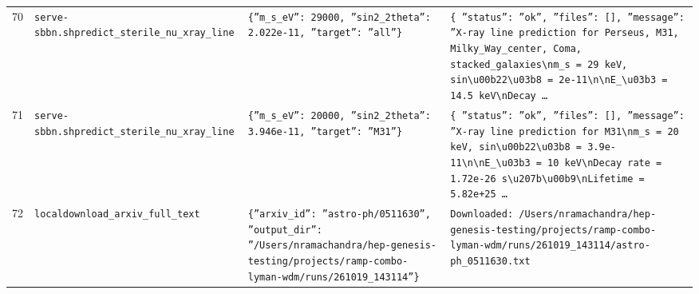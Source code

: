 \documentclass[11pt,a4paper]{article}
\begin{document}
\begin{longtable}{@{}p{}p{}p{}p{}@{}}
70 & \texttt{serve-sbbn.sh}\newline\texttt{predict\_\allowbreak{}sterile\_\allowbreak{}nu\_\allowbreak{}xray\_\allowbreak{}line} & \texttt{\{''m\_\allowbreak{}s\_\allowbreak{}eV'':\allowbreak{} 29000,\allowbreak{} ''sin2\_\allowbreak{}2theta'':\allowbreak{} 2.022e-11,\allowbreak{} ''target'':\allowbreak{} ''all''\}\allowbreak{}} & \texttt{\{   ''status'':\allowbreak{} ''ok'',\allowbreak{}   ''files'':\allowbreak{} []\allowbreak{},\allowbreak{}   ''message'':\allowbreak{} ''X-ray line prediction for Perseus,\allowbreak{} M31,\allowbreak{} Milky\_\allowbreak{}Way\_\allowbreak{}center,\allowbreak{} Coma,\allowbreak{} stacked\_\allowbreak{}galaxies\textbackslash{}\allowbreak{}nm\_\allowbreak{}s =\allowbreak{} 29 keV,\allowbreak{} sin\textbackslash{}\allowbreak{}u00b22\textbackslash{}\allowbreak{}u03b8 =\allowbreak{} 2e-11\textbackslash{}\allowbreak{}n\textbackslash{}\allowbreak{}nE\_\allowbreak{}\textbackslash{}\allowbreak{}u03b3 =\allowbreak{} 14.5 keV\textbackslash{}\allowbreak{}nDecay \ldots{}\allowbreak{}} \\
71 & \texttt{serve-sbbn.sh}\newline\texttt{predict\_\allowbreak{}sterile\_\allowbreak{}nu\_\allowbreak{}xray\_\allowbreak{}line} & \texttt{\{''m\_\allowbreak{}s\_\allowbreak{}eV'':\allowbreak{} 20000,\allowbreak{} ''sin2\_\allowbreak{}2theta'':\allowbreak{} 3.946e-11,\allowbreak{} ''target'':\allowbreak{} ''M31''\}\allowbreak{}} & \texttt{\{   ''status'':\allowbreak{} ''ok'',\allowbreak{}   ''files'':\allowbreak{} []\allowbreak{},\allowbreak{}   ''message'':\allowbreak{} ''X-ray line prediction for M31\textbackslash{}\allowbreak{}nm\_\allowbreak{}s =\allowbreak{} 20 keV,\allowbreak{} sin\textbackslash{}\allowbreak{}u00b22\textbackslash{}\allowbreak{}u03b8 =\allowbreak{} 3.9e-11\textbackslash{}\allowbreak{}n\textbackslash{}\allowbreak{}nE\_\allowbreak{}\textbackslash{}\allowbreak{}u03b3 =\allowbreak{} 10 keV\textbackslash{}\allowbreak{}nDecay rate =\allowbreak{} 1.72e-26 s\textbackslash{}\allowbreak{}u207b\textbackslash{}\allowbreak{}u00b9\textbackslash{}\allowbreak{}nLifetime =\allowbreak{} 5.82e+25 \ldots{}\allowbreak{}} \\
72 & \texttt{local}\newline\texttt{download\_\allowbreak{}arxiv\_\allowbreak{}full\_\allowbreak{}text} & \texttt{\{''arxiv\_\allowbreak{}id'':\allowbreak{} ''astro-ph/\allowbreak{}0511630'',\allowbreak{} ''output\_\allowbreak{}dir'':\allowbreak{} ''/\allowbreak{}Users/\allowbreak{}nramachandra/\allowbreak{}hep-genesis-testing/\allowbreak{}projects/\allowbreak{}ramp-combo-lyman-wdm/\allowbreak{}runs/\allowbreak{}261019\_\allowbreak{}143114''\}\allowbreak{}} & \texttt{Downloaded:\allowbreak{} /\allowbreak{}Users/\allowbreak{}nramachandra/\allowbreak{}hep-genesis-testing/\allowbreak{}projects/\allowbreak{}ramp-combo-lyman-wdm/\allowbreak{}runs/\allowbreak{}261019\_\allowbreak{}143114/\allowbreak{}astro-ph\_\allowbreak{}0511630.txt} \\

\end{longtable}
\end{document}
